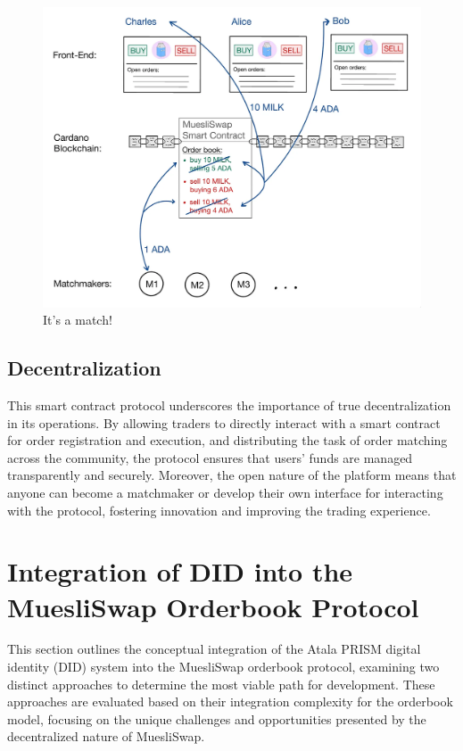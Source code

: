 \documentclass[11pt]{article}
\begin{document}
\begin{figure}[H]
    \centering
    \includegraphics[scale=0.18]{illustration3.png}
    \caption{It's a match!}
    \label{fig:illustration3}
\end{figure}




\subsection{Decentralization} 
This smart contract protocol underscores the importance of true decentralization in its operations. By allowing traders to directly interact with a smart contract for order registration and execution, and distributing the task of order matching across the community, the protocol ensures that users' funds are managed transparently and securely. Moreover, the open nature of the platform means that anyone can become a matchmaker or develop their own interface for interacting with the protocol, fostering innovation and improving the trading experience.

\newpage
\section{Integration of DID into the MuesliSwap Orderbook Protocol}

This section outlines the conceptual integration of the Atala PRISM digital identity (DID) system into the MuesliSwap orderbook protocol, examining two distinct approaches to determine the most viable path for development. These approaches are evaluated based on their integration complexity for the orderbook model, focusing on the unique challenges and opportunities presented by the decentralized nature of MuesliSwap.
\end{document}
